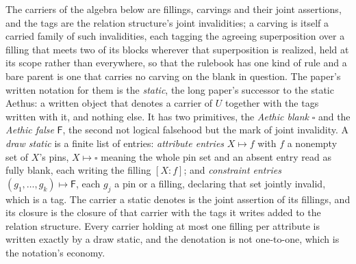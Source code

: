 The carriers of the algebra below are fillings, carvings and their joint assertions, and the tags are the relation structure's joint invalidities; a carving is itself a carried family of such invalidities, each tagging the agreeing superposition over a filling that meets two of its blocks wherever that superposition is realized, held at its scope rather than everywhere, so that the rulebook has one kind of rule and a bare parent is one that carries no carving on the blank in question. The paper's written notation for them is the \emph{static}, the long paper's successor to the static Aethus: a written object that denotes a carrier of $U$ together with the tags written with it, and nothing else. It has two primitives, the \emph{Aethic blank} $\square$ and the \emph{Aethic false} $\mathsf{F}$, the second not logical falsehood but the mark of joint invalidity. A \emph{draw static} is a finite list of entries: \emph{attribute entries} $X \mapsto f$ with $f$ a nonempty set of $X$'s pins, $X \mapsto \square$ meaning the whole pin set and an absent entry read as fully blank, each writing the filling $[X : f]$; and \emph{constraint entries} $(g_1, \ldots, g_k) \mapsto \mathsf{F}$, each $g_j$ a pin or a filling, declaring that set jointly invalid, which is a tag. The carrier a static denotes is the joint assertion of its fillings, and its closure is the closure of that carrier with the tags it writes added to the relation structure. Every carrier holding at most one filling per attribute is written exactly by a draw static, and the denotation is not one-to-one, which is the notation's economy.

